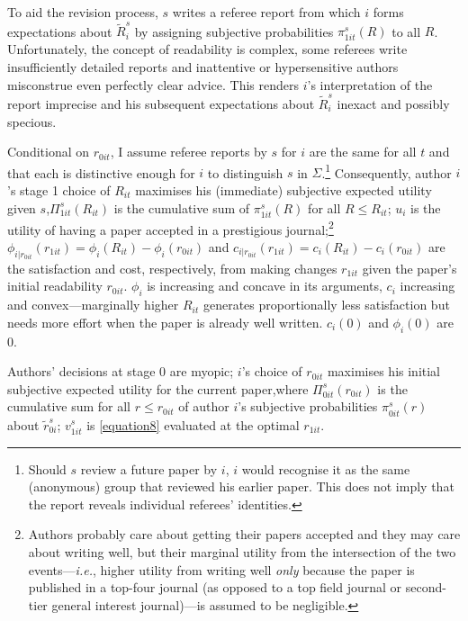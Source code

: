 To aid the revision process, $s$ writes a referee report from which $i$ forms expectations about $\widetilde R_i^s$ by assigning subjective probabilities $\pi_{1it}^s(R)$ to all $R$. Unfortunately, the concept of readability is complex, some referees write insufficiently detailed reports and inattentive or hypersensitive authors misconstrue even perfectly clear advice. This renders $i$'s interpretation of the report imprecise and his subsequent expectations about $\widetilde R_i^s$ inexact and possibly specious.

Conditional on $r_{0it}$, I assume referee reports by $s$ for $i$ are the same for all $t$ and that each is distinctive enough for $i$ to distinguish $s$ in $\Sigma$.\footnote{Should $s$ review a future paper by $i$, $i$ would recognise it as the same (anonymous) group that reviewed his earlier paper. This does not imply that the report reveals individual referees' identities.} Consequently, author $i$'s stage 1 choice of $R_{it}$ maximises his (immediate) subjective expected utility given $s$,$\Pi_{1it}^s(R_{it})$ is the cumulative sum of $\pi_{1it}^s(R)$ for all $R\le R_{it}$; $u_i$ is the utility of having a paper accepted in a prestigious journal;\footnote{Authors probably care about getting their papers accepted and they may care about writing well, but their marginal utility from the intersection of the two events---\emph{i.e.}, higher utility from writing well \emph{only} because the paper is published in a top-four journal (as opposed to a top field journal or second-tier general interest journal)---is assumed to be negligible.} $\phi_{i|r_{0it}}(r_{1it})=\phi_i(R_{it})-\phi_i(r_{0it})$ and $c_{i|r_{0it}}(r_{1it})=c_{i}(R_{it})-c_{i}(r_{0it})$ are the satisfaction and cost, respectively, from making changes $r_{1it}$ given the paper's initial readability $r_{0it}$. $\phi_i$ is increasing and concave in its arguments, $c_i$ increasing and convex---marginally higher $R_{it}$ generates proportionally less satisfaction but needs more effort when the paper is already well written. $c_i(0)$ and $\phi_i(0)$ are 0.

Authors' decisions at stage 0 are myopic; $i$'s choice of $r_{0it}$ maximises his initial subjective expected utility for the current paper,where $\Pi_{0it}^s(r_{0it})$ is the cumulative sum for all $r\le r_{0it}$ of author $i$'s subjective probabilities $\pi_{0it}^s(r)$ about $\widetilde r_{0i}^s$; $v_{1it}^s$ is \autoref{equation8} evaluated at the optimal $r_{1it}$.

